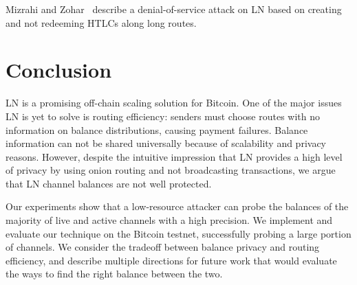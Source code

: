 Mizrahi and Zohar~\cite{Mizrahi2020} describe a denial-of-service attack on LN based on creating and not redeeming HTLCs along long routes.


\section{Conclusion} \label{sec:conclusion}
LN is a promising off-chain scaling solution for Bitcoin.
One of the major issues LN is yet to solve is routing efficiency: senders must choose routes with no information on balance distributions, causing payment failures.
Balance information can not be shared universally because of scalability and privacy reasons.
However, despite the intuitive impression that LN provides a high level of privacy by using onion routing and not broadcasting transactions, we argue that LN channel balances are not well protected.

Our experiments show that a low-resource attacker can probe the balances of the majority of live and active channels with a high precision.
We implement and evaluate our technique on the Bitcoin testnet, successfully probing a large portion of channels.
We consider the tradeoff between balance privacy and routing efficiency, and describe multiple directions for future work that would evaluate the ways to find the right balance between the two.

